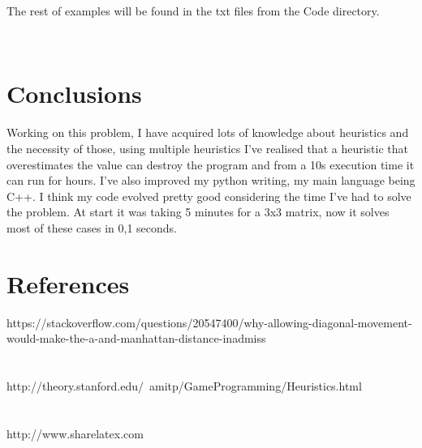 \documentclass[14pt]{article}
\begin{document}
\begin{center}
The rest of examples will be found in the txt files from the Code directory.
\end{center}\\


\newpage
\section*{Conclusions}
\vspace{20 mm}
Working on this problem, I have acquired lots of knowledge about heuristics and the necessity of those, using multiple heuristics I've realised that a heuristic that overestimates the value can destroy the program and from a 10s execution time it can run for hours. I've also improved my python writing, my main language being C++. I think my code evolved pretty good considering the time I've had to solve the problem. At start it was taking 5 minutes for a 3x3 matrix, now it solves most of these cases in 0,1 seconds. 
\\\vspace{20mm}
\section*{References}
\large https://stackoverflow.com/questions/20547400/why-allowing-diagonal-movement-would-make-the-a-and-manhattan-distance-inadmiss
\\
\\\vspace{6mm}
\\
http://theory.stanford.edu/~amitp/GameProgramming/Heuristics.html
\\
\\\vspace{6mm}
\\
http://www.sharelatex.com
\end{document}
